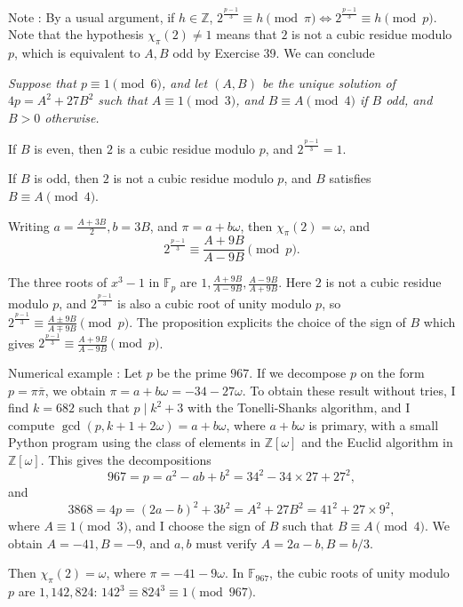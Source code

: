 \documentclass[11pt,a4paper]{article}
\newcommand{\Z}{\mathbb{Z}}
\newcommand{\F}{\mathbb{F}}
\begin{document}
Note : By a usual argument, if $h \in \Z$, $2^{\frac{p-1}{3}} \equiv h \pmod \pi \iff 2^{\frac{p-1}{3}} \equiv h \pmod p$. Note that the hypothesis $\chi_\pi(2) \ne 1$ means that $2$ is not a cubic residue modulo $p$, which is equivalent to $A,B$ odd by Exercise 39. We can conclude

\bigskip

{\it
Suppose that $p \equiv 1 \pmod 6$, and let $(A,B)$ be the unique solution of $4p = A^2 + 27 B^2$ such that $A \equiv 1 \pmod 3$, and $B\equiv A \pmod 4$ if $B$ odd, and $B>0$ otherwise.

If $B$ is even, then $2$ is a cubic residue modulo $p$, and $2^\frac{p-1}{3} = 1$.

If $B$ is odd, then $2$ is not a cubic residue modulo $p$, and $B$ satisfies $B \equiv A \pmod 4$. 

Writing $a = \frac{A+3B}{2}, b = 3B$, and $\pi = a + b \omega$, then  $\chi_\pi(2) = \omega$, and
$$2^{\frac{p-1}{3}}  \equiv \frac{A+9B}{A-9B} \pmod p.$$
}

\bigskip

The three roots of $x^3 - 1$ in $\F_p$ are $1, \frac{A+9B}{A-9B}, \frac{A-9B}{A+9B}$. Here $2$ is not a cubic residue modulo $p$, and $2^{\frac{p-1}{3}}$ is also a cubic root of unity modulo $p$, so $2^{\frac{p-1}{3}} \equiv  \frac{A\pm 9B}{A\mp9B} \pmod p$. The proposition  explicits the choice of the sign of $B$ which gives $2^{\frac{p-1}{3}}  \equiv \frac{A+9B}{A-9B} \pmod p$.

\bigskip

Numerical example : Let $p$ be the prime $967$. If we decompose $p$ on the form $p = \pi \overline{\pi}$, we obtain $\pi =  a + b \omega = -34 -27 \omega$. To obtain these result without tries, I find $k = 682$ such that $p \mid k^2 + 3$ with the Tonelli-Shanks algorithm, and I compute $\gcd(p, k+1 + 2\omega) = a + b \omega$, where $a + b \omega$ is primary, with a small Python program using the class of elements in $\Z[\omega]$ and the Euclid algorithm in $\Z[\omega]$. This gives the decompositions 
$$967 = p = a^2 -ab + b^2 = 34^2 - 34\times 27 + 27^2,$$
 and 
 $$3868 = 4p = (2a -b)^2 + 3b^2 = A^2 + 27 B^2 = 41^2 + 27 \times 9^2,$$
 where $A \equiv 1 \pmod 3$, and I choose the sign of $B$ such that $B \equiv A \pmod 4$. We obtain $A = -41, B = -9$, and $a,b$ must verify $A = 2a-b, B = b/3$.
 
  Then $\chi_\pi(2) = \omega$, where $\pi = -41 - 9 \omega$. In $\F_{967}$, the cubic roots of unity modulo $p$ are $1, 142, 824$: $142^3 \equiv 824^3 \equiv 1 \pmod {967}$. 
  
\end{document}
